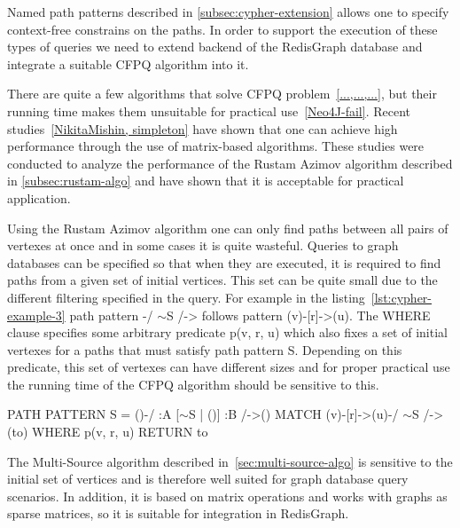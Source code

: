 Named path patterns described in \autoref{subsec:cypher-extension} allows one to specify context-free constrains on the paths. In order to support the execution of these types of queries we need to extend backend of the RedisGraph database and integrate a suitable CFPQ algorithm into it. 

There are quite a few algorithms that solve CFPQ problem~\ref{...,...,...}, but their running time makes them unsuitable for practical use~\ref{Neo4J-fail}. Recent studies~\ref{NikitaMishin, simpleton} have shown that one can achieve high performance through the use of matrix-based algorithms. These studies were conducted to analyze the performance of the Rustam Azimov algorithm described in \autoref{subsec:rustam-algo} and have shown that it is acceptable for practical application.

Using the Rustam Azimov algorithm one can only find paths between all pairs of vertexes at once and in some cases it is quite wasteful. Queries to graph databases can be specified so that when they are executed, it is required to find paths from a given set of initial vertices. This set can be quite small due to the different filtering specified in the query. For example in the listing~\ref{lst:cypher-example-3} path pattern \colorbox{blue!10}{-/ $\sim$S /->} follows pattern \colorbox{blue!10}{(v)-[r]->(u)}. The WHERE clause specifies some arbitrary predicate \colorbox{blue!10}{p(v, r, u)} which also fixes a set of initial vertexes for a paths that must satisfy path pattern \colorbox{blue!10}{S}. Depending on this predicate, this set of vertexes can have different sizes and for proper practical use the running time of the CFPQ algorithm should be sensitive to this.

\begin{algorithm}
\begin{algorithmic}[1]
\caption{...}
\label{lst:cypher-example-3}
\State PATH PATTERN S = ()-/ :A [$\sim$S | ()] :B /->()
\State MATCH (v)-[r]->(u)-/ $\sim$S /->(to)
\State WHERE p(v, r, u)
\State RETURN to
\end{algorithmic}
\end{algorithm}

The Multi-Source algorithm described in~\autoref{sec:multi-source-algo} is sensitive to the initial set of vertices and is therefore well suited for graph database query scenarios. In addition, it is based on matrix operations and works with graphs as sparse matrices, so it is suitable for integration in RedisGraph.

